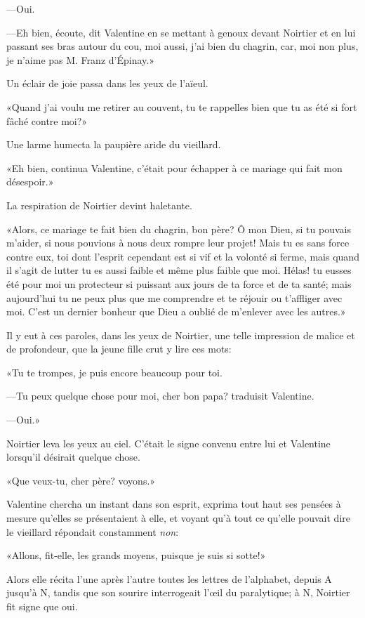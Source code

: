 —Oui. 

—Eh bien, écoute, dit Valentine en se mettant à genoux devant Noirtier et en lui passant ses bras autour du cou, moi aussi, j'ai bien du chagrin, car, moi non plus, je n'aime pas M. Franz d'Épinay.» 

Un éclair de joie passa dans les yeux de l'aïeul. 

«Quand j'ai voulu me retirer au couvent, tu te rappelles bien que tu as été si fort fâché contre moi?» 

Une larme humecta la paupière aride du vieillard. 

«Eh bien, continua Valentine, c'était pour échapper à ce mariage qui fait mon désespoir.» 

La respiration de Noirtier devint haletante. 

«Alors, ce mariage te fait bien du chagrin, bon père? Ô mon Dieu, si tu pouvais m'aider, si nous pouvions à nous deux rompre leur projet! Mais tu es sans force contre eux, toi dont l'esprit cependant est si vif et la volonté si ferme, mais quand il s'agit de lutter tu es aussi faible et même plus faible que moi. Hélas! tu eusses été pour moi un protecteur si puissant aux jours de ta force et de ta santé; mais aujourd'hui tu ne peux plus que me comprendre et te réjouir ou t'affliger avec moi. C'est un dernier bonheur que Dieu a oublié de m'enlever avec les autres.» 

Il y eut à ces paroles, dans les yeux de Noirtier, une telle impression de malice et de profondeur, que la jeune fille crut y lire ces mots: 

«Tu te trompes, je puis encore beaucoup pour toi. 

—Tu peux quelque chose pour moi, cher bon papa? traduisit Valentine. 

—Oui.» 

Noirtier leva les yeux au ciel. C'était le signe convenu entre lui et Valentine lorsqu'il désirait quelque chose. 

«Que veux-tu, cher père? voyons.» 

Valentine chercha un instant dans son esprit, exprima tout haut ses pensées à mesure qu'elles se présentaient à elle, et voyant qu'à tout ce qu'elle pouvait dire le vieillard répondait constamment \textit{non}: 

«Allons, fit-elle, les grands moyens, puisque je suis si sotte!» 

Alors elle récita l'une après l'autre toutes les lettres de l'alphabet, depuis A jusqu'à N, tandis que son sourire interrogeait l'œil du paralytique; à N, Noirtier fit signe que oui. 

